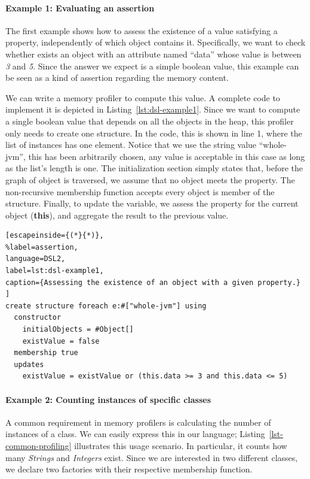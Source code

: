\paragraph{Example 1: Evaluating an assertion}
The first example shows how to assess the existence of a value satisfying a property, independently of which object contains it.
Specifically, we want to check whether exists an object with an attribute named ``data'' whose value is between \textit{3} and \textit{5}.
Since the answer we expect is a simple boolean value, this example can be seen as a kind of assertion regarding the memory content.

We can write a memory profiler to compute this value.
A complete code to implement it is depicted in Listing~\ref{lst:dsl-example1}.
Since we want to compute a single boolean value that depends on all the objects in the heap, this profiler only needs to create one structure.
In the code, this is shown in line 1, where the list of instances has one element.
Notice that we use the string value ``whole-jvm'', this has been arbitrarily chosen, any value is acceptable in this case as long as the list's length is one.
The initialization section simply states that, before the graph of object is traversed, we assume that no object meets the property.
The non-recursive membership function accepts every object is member of the structure.
Finally, to update the variable, we assess the property for the current object (\textbf{this}), and aggregate the result to the previous value.

\begin{lstlisting}[escapeinside={(*}{*)},
%label=assertion, 
language=DSL2,
label=lst:dsl-example1,
caption={Assessing the existence of an object with a given property.}
]
create structure foreach e:#["whole-jvm"] using
  constructor
    initialObjects = #Object[]
    existValue = false
  membership true
  updates 
    existValue = existValue or (this.data >= 3 and this.data <= 5)
\end{lstlisting}

\paragraph{Example 2: Counting instances of specific classes}
A common requirement in memory profilers is calculating the number of instances of a class.
We can easily express this in our language; Listing~\ref{lst-common-profiling} illustrates this usage scenario.
In particular, it counts how many \textit{Strings} and \textit{Integers} exist. 
Since we are interested in two different classes, we declare two factories with their respective membership function.

